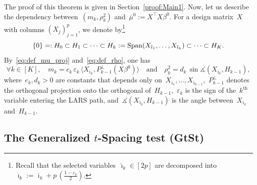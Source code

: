 \documentclass[final,numbib]{imaiai}%
\numberwithin{equation}{section}
\def\eq{\begin{equation}}
\def\qe{\end{equation}}
\renewcommand{\bar}{\overline}
\newcommand{\<}{\langle}
\renewcommand{\>}{\rangle}
\newcommand{\1}{\mathds{1}}
\begin{document}
{\noindent The proof of this theorem is given in Section~\ref{proof:Main1}.
Now, let us describe the dependency between~$(m_k,\rho_k^2)$ and~$\bar\mu^0:=X^\top X\beta^0$.
For a design matrix~$X$ with columns $(X_{j})_{j=1}^p$, we denote by\footnote{Recall that the selected variables~$\widehat\imath_k\in[2p]$ are decomposed into~$\widehat\imath_k:=\bar \imath_k+p\,(\frac{1-\varepsilon_k}2)$.} 
\eq
\notag
\{0\}=:H_0\subset
H_1\subset \cdots \subset H_k:=\mathrm{Span}(X_{\bar\imath_1},\ldots,X_{ \bar\imath_k})\subset \cdots \subset H_K.
\qe
By~\eqref{eq:def_mu_proj} and~\eqref{eq:def_rho}, one has 
\[
\forall k\in[K],\quad 
 m_k = c_k \, \varepsilon_k\, \langle X_{\bar\imath_k},P_{k-1}^\perp(X\beta^0)\rangle\quad \text{and}\quad \rho_k^2 =d_k\, \sin \measuredangle (X_{\bar\imath_k}, H_{k-1}),
\]
where~$c_k,d_k>0$ are constants that depends only on~$X_{\bar\imath_1},\ldots,X_{ \bar\imath_{k-1}}$,~$P_{k-1}^\perp$ denotes the orthogonal projection onto the orthogonal of~$H_{k-1}$,~$\varepsilon_k$ is the sign of the~$k^{\text{th}}$ variable entering the LARS path, and~$\measuredangle (X_{\bar\imath_k}, H_{k-1})$ is the angle between~$X_{\bar\imath_k}$ and~$H_{k-1}$.

\subsection{The Generalized $t$-Spacing test (GtSt)}

}
\end{document}
